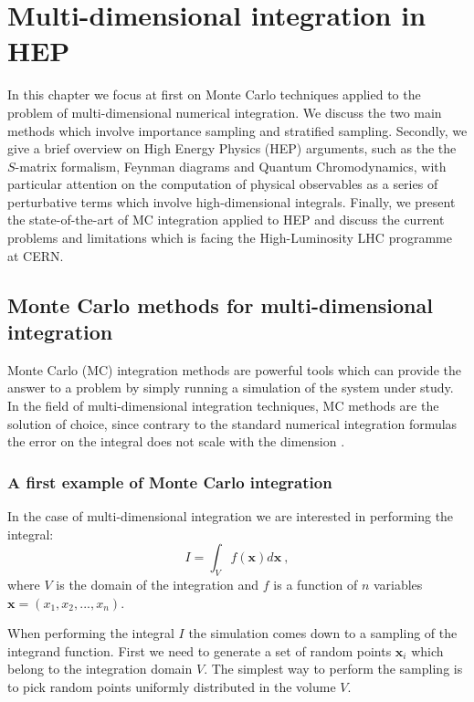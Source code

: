 \documentclass[../main/main.tex]{subfiles}
\begin{document}
\chapter[Multi-dimensional integration in HEP]{Multi-dimensional integration in HEP}
In this chapter we focus at first on Monte Carlo techniques applied to the problem of multi-dimensional numerical integration.
We discuss the two main methods which involve importance sampling and stratified sampling.
Secondly, we give a brief overview on High Energy Physics (HEP) arguments, such as the the $S$-matrix formalism, Feynman diagrams and Quantum Chromodynamics, with particular attention 
on the computation of physical observables as a series of perturbative terms which involve high-dimensional integrals.
Finally, we present the state-of-the-art of  MC integration applied to HEP and discuss the current problems and limitations which
is facing the High-Luminosity LHC programme at CERN.

\section[MC methos for multi-dimensional integration]{Monte Carlo methods for multi-dimensional integration}
Monte Carlo (MC) integration methods are powerful tools which can provide the answer to a 
problem by simply running a simulation of the system under study.
In the field of multi-dimensional integration techniques, MC methods are the solution of choice, since contrary 
to the standard numerical integration formulas  the error on the integral does not scale with the dimension \cite{Press:1992zz}. 


\subsection{A first example of Monte Carlo integration}
In the case of multi-dimensional integration we are interested in performing the
integral:
\begin{equation}
	I = \int_{V}   f(\textbf{x}) d \textbf{x} \ , 
\end{equation}
where $V$ is the domain of the integration and $f$ is a function of $n$ variables 
$\textbf{x} = (x_1,x_2, ..., x_n)$.

When performing the integral $I$ the simulation comes down to a sampling of the integrand function.
First we need to generate a set of random points $\textbf{x}_i$ which belong to the integration domain $V$.
The simplest way to perform the sampling is to pick random points uniformly distributed 
in the volume $V$.
\end{document}
